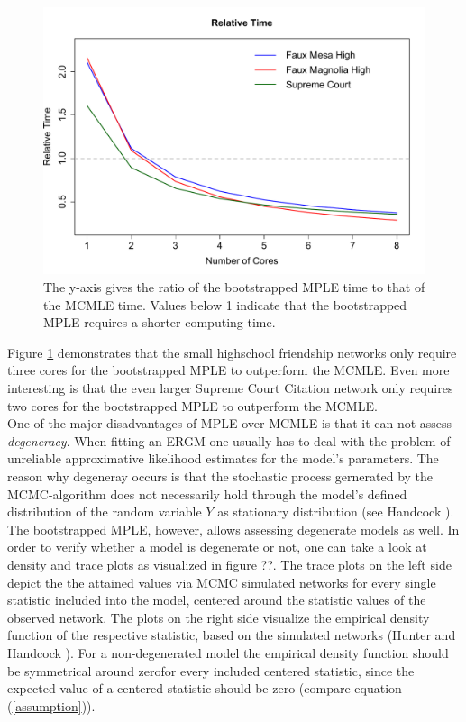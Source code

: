 \documentclass[headsepline=true, abstracton]{scrartcl}
\begin{document}
\begin{figure}
\begin{center}
\includegraphics[scale=.45]{rel_time}
\caption{The y-axis gives the ratio of the bootstrapped MPLE time to that of the MCMLE time. Values below 1 indicate that the bootstrapped MPLE requires a shorter computing time.}
\label{comptime}
\end{center}
\end{figure}
Figure \ref{comptime} demonstrates that the small highschool friendship networks only require three cores for the bootstrapped MPLE to outperform the MCMLE. Even more interesting is that the even larger Supreme Court Citation network only requires two cores for the bootstrapped MPLE to outperform the MCMLE.\\[0.3cm]
One of the major disadvantages of MPLE over MCMLE is that it can not assess {\it degeneracy}. When fitting an ERGM one usually has to deal with the problem of unreliable approximative likelihood estimates for the model's parameters. The reason why degeneray occurs is that the stochastic process gernerated by the MCMC-algorithm does not necessarily hold through the model's defined distribution of the random variable $Y$ as stationary distribution (see Handcock \cite{Handcock.2003}). The bootstrapped MPLE, however, allows assessing degenerate models as well. In order to verify whether a model is degenerate or not, one can take a look at density and trace plots as visualized in figure ??. The trace plots on the left side depict the the attained values via MCMC simulated networks for every single statistic included into the model, centered around the statistic values of the observed network. The plots on the right side visualize the empirical density function of the respective statistic, based on the simulated networks (Hunter and Handcock \cite{Hunter.2006}). For a non-degenerated model the empirical density function should be symmetrical around zerofor every included centered statistic, since the expected value of a centered statistic should be zero (compare equation (\ref{assumption})). 
\end{document}
